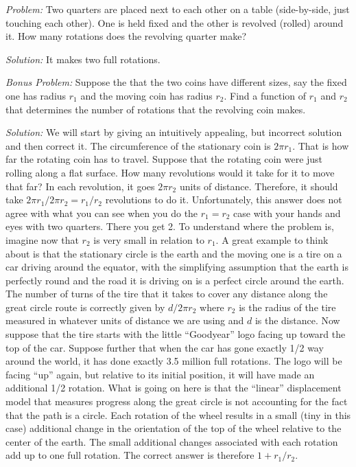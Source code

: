 \documentclass[11pt,a4paper]{report}
\theoremstyle{plain}
\theoremstyle{definition}
\theoremstyle{remark}
\begin{document}
\textit{Problem:} Two quarters are placed next to each other on a table (side-by-side, just touching each other).  One is held fixed and the other is revolved (rolled) around it.  How many rotations does the revolving quarter make?  

\textit{Solution: } It makes two full rotations. 

\textit{Bonus Problem:} Suppose the that the two coins have different sizes, say the fixed one has radius $r_1$ and the moving coin has radius $r_2$.  Find a function of $r_1$ and $r_2$ that determines the number of rotations that the revolving coin makes.

\textit{Solution:} We will start by giving an intuitively appealing, but incorrect solution and then correct it. The circumference of the stationary coin is $2{\pi}r_1$. That is how far the rotating coin has to travel.  Suppose that the rotating coin were just rolling along a flat surface.  How many revolutions would it take for it to move that far?  In each revolution, it goes $2{\pi}r_2$ units of distance.  Therefore, it should take $2{\pi}r_1 / 2{\pi}r_2 = r_1/r_2$ revolutions to do it. Unfortunately, this answer does not agree with what you can see when you do the $r_1 = r_2$ case with your hands and eyes with two quarters. There you get 2. To understand where the problem is, imagine now that $r_2$ is very small in relation to $r_1$.  A great example to think about is that the stationary circle is the earth and the moving one is a tire on a car driving around the equator, with the simplifying assumption that the earth is perfectly round and the road it is driving on is a perfect circle around the earth.  The number of turns of the tire that it takes to cover any distance along the great circle route is correctly given by $d/2{\pi}r_2$ where $r_2$ is the radius of the tire measured in whatever units of distance we are using and $d$ is the distance.  Now suppose that the tire starts with the little ``Goodyear'' logo facing up toward the top of the car.  Suppose further that when the car has gone exactly 1/2 way around the world, it has done exactly 3.5 million full rotations.  The logo will be facing ``up'' again, but relative to its initial position, it will have made an additional 1/2 rotation.  What is going on here is that the ``linear'' displacement model that measures progress along the great circle is not accounting for the fact that the path is a circle.  Each rotation of the wheel results in a small (tiny in this case) additional change in the orientation of the top of the wheel relative to the center of the earth. The small additional changes associated with each rotation add up to one full rotation.  The correct answer is therefore $1 + r_1/r_2$.
\end{document}
